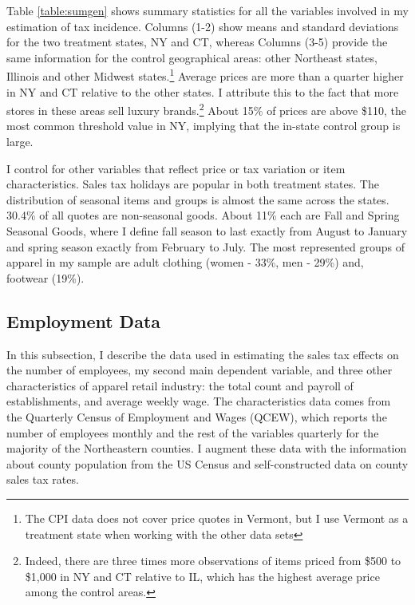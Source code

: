 \documentclass[12pt]{article}
\begin{document}
		Table \ref{table:sumgen} shows summary statistics for all the variables involved in my estimation of tax incidence. Columns (1-2) show means and standard deviations for the two treatment states, NY and CT, whereas Columns (3-5) provide the same information for the control geographical areas: other Northeast states, Illinois and other Midwest states.\footnote{The CPI data does not cover price quotes in Vermont, but I use Vermont as a treatment state when working with the other data sets} Average prices are more than a quarter higher in NY and CT relative to the other states. I attribute this to the fact that more stores in these areas sell luxury brands.\footnote{Indeed, there are three times more observations of items priced from \$500 to \$1,000 in NY and CT relative to IL, which has the highest average price among the control areas.} About 15\% of prices are above \$110, the most common threshold value in NY, implying that the in-state control group is large.
		
		
		
		
		
		I control for other variables that reflect price or tax variation or item characteristics. Sales tax holidays are popular in both treatment states. The distribution of seasonal items and groups is almost the same across the states. 30.4\% of all quotes are non-seasonal goods. About 11\% each are Fall and Spring Seasonal Goods, where I define fall season to last exactly from August to January and spring season exactly from February to July. The most represented groups of apparel in my sample are adult clothing (women - 33\%, men - 29\%) and, footwear (19\%).
		
		
	
	
	\subsection{Employment Data}
		
		In this subsection, I describe the data used in estimating the sales tax effects on the number of employees, my second main dependent variable, and three other characteristics of apparel retail industry: the total count and payroll of establishments, and average weekly wage. The characteristics data comes from the Quarterly Census of Employment and Wages (QCEW), which reports the number of employees monthly and the rest of the variables quarterly for the majority of the Northeastern counties. I augment these data with the information about county population from the US Census and self-constructed data on county sales tax rates.		
		
\end{document}
